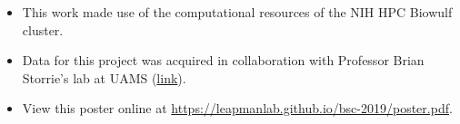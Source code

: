 \documentclass[final]{beamer}
\newlength{\onecolwid}
\renewcommand{\emph}[1]{{\color{nibib2} #1}}
\begin{document}
\begin{frame}[t]
\begin{columns}[t]
\begin{column}{\onecolwid}
    \begin{tcolorbox}[title=Acknowledgements]
        \begin{itemize}
            \item This work made use of the computational resources of the \emph{NIH HPC Biowulf cluster}.
            \item Data for this project was acquired in collaboration with Professor Brian Storrie's lab at UAMS (\href{https://physiology.uams.edu/faculty/brian-storrie/}{link}).            
            \item \emph{View this poster online} at \href{https://leapmanlab.github.io/bsc-2019/poster.pdf}{https://leapmanlab.github.io/bsc-2019/poster.pdf}.
        \end{itemize}
    \end{tcolorbox}
    
    
\end{column}

\end{columns}

\end{frame}
\end{document}
